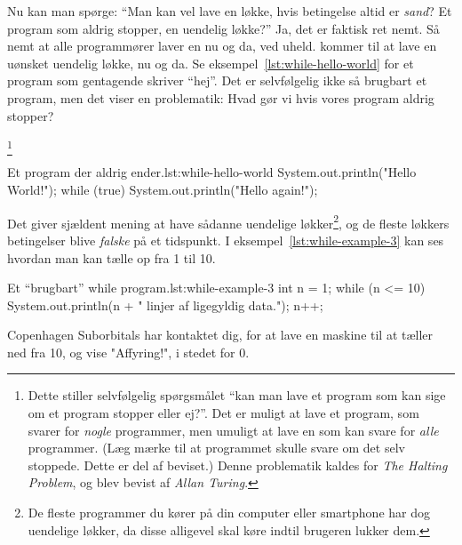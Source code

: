         Nu kan man spørge: ``Man kan vel lave en løkke, hvis
        betingelse altid er \emph{sand}? Et program som aldrig
        stopper, en uendelig løkke?'' Ja, det er faktisk ret nemt. Så
        nemt at alle programmører laver en nu og da, ved uheld.
        kommer til at lave en uønsket uendelig løkke, nu og da. Se
        eksempel~\ref{lst:while-hello-world} for et program som
        gentagende skriver ``hej''. Det er selvfølgelig ikke så
        brugbart et program, men det viser en problematik: Hvad gør vi
        hvis vores program aldrig stopper? 

        \footnote{Dette stiller selvfølgelig spørgsmålet ``kan man
        lave et program som kan sige om et program stopper eller
        ej?''. Det er muligt at lave et program, som svarer for
        \emph{nogle} programmer, men umuligt at lave en som kan svare
        for \emph{alle} programmer.  (Læg mærke til at programmet
        skulle svare om det selv stoppede. Dette er del af beviset.)
        Denne problematik kaldes for \emph{The Halting Problem}, og
        blev bevist af \emph{Allan Turing}.}

		\begin{JavaCode}{Et program der aldrig ender.}{lst:while-hello-world}
			System.out.println("Hello World!");
			while (true) {
				System.out.println("Hello again!");
			}
		\end{JavaCode}

        Det giver sjældent mening at have sådanne uendelige
        løkker\footnote{De fleste programmer du kører på din computer
        eller smartphone har dog uendelige løkker, da disse alligevel
        skal køre indtil brugeren lukker dem.}, og de fleste løkkers
        betingelser blive \emph{falske} på et tidspunkt. I
        eksempel~\ref{lst:while-example-3} kan ses hvordan man kan
        tælle op fra 1 til 10.

		\begin{JavaCode}{Et ``brugbart'' while program.}{lst:while-example-3}
			int n = 1;
			while (n <= 10) {
				System.out.println(n + " linjer af ligegyldig data.");
				n++;
			}
		\end{JavaCode}

		\begin{exercise}
			Copenhagen Suborbitals har kontaktet dig, for at lave en maskine til
			at tæller ned fra 10, og vise "Affyring!", i stedet for 0.
		\end{exercise}

